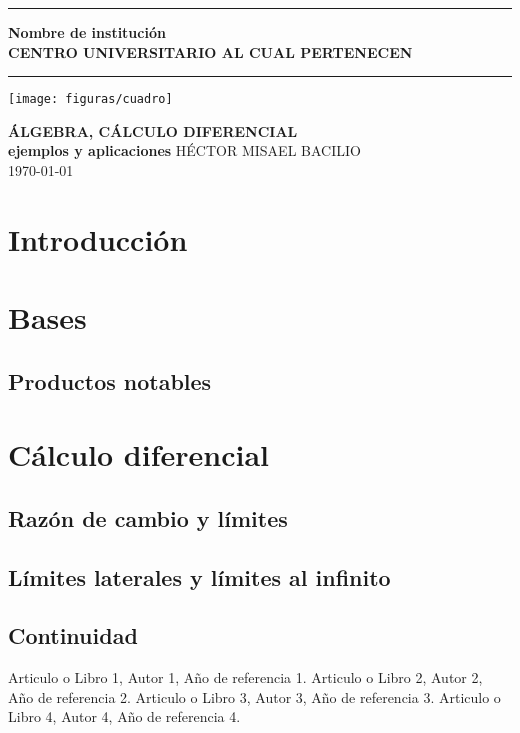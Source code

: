 \documentclass[12pt]{article}
\begin{document}
\begin{titlepage}
\begin{center}
\vspace*{2\baselineskip}
\hrule height 3pt
\vspace*{0.5\baselineskip}
{\Huge \textbf{Nombre de institución}}\\[0.1cm]
{\large \textbf{CENTRO UNIVERSITARIO AL CUAL PERTENECEN}}
\vspace*{0.5\baselineskip}
\hrule
\vspace*{7\baselineskip}
\texttt{[image: figuras/cuadro]}
\vspace*{2\baselineskip}

\textbf{ÁLGEBRA, CÁLCULO DIFERENCIAL \\
ejemplos y aplicaciones}
\vfill
HÉCTOR MISAEL BACILIO \\
\today
\end{center}
\end{titlepage}

\tableofcontents
\thispagestyle{empty}
\newpage
\setcounter{page}{1}

\section{Introducción}
\section{Bases}
\subsection{Productos notables}
\section{Cálculo diferencial}
\subsection{Razón de cambio y límites}
\subsection{Límites laterales y límites al infinito}
\subsection{Continuidad}

\newpage
\begin{thebibliography}{99}
 Articulo o Libro 1, Autor 1, Año de referencia 1. 
 Articulo o Libro 2, Autor 2, Año de referencia 2. 
 Articulo o Libro 3, Autor 3, Año de referencia 3. 
 Articulo o Libro 4, Autor 4, Año de referencia 4. 
\end{thebibliography}
\end{document}
